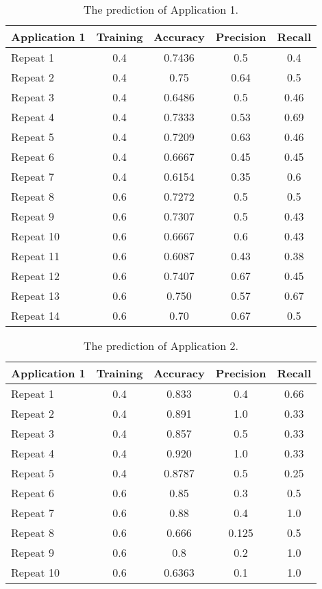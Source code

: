 \begin{table}[ht]
	\begin{center}
		\begin{tabular}{ | l | c | c | c | c | }
			\hline
			Application 1 & Training & Accuracy & Precision & Recall \\ \hline
			Repeat 1 & 0.4 & 0.7436 & 0.5  & 0.4  \\ \hline
			Repeat 2 & 0.4 & 0.75   & 0.64 & 0.5  \\ \hline
			Repeat 3 & 0.4 & 0.6486 & 0.5  & 0.46 \\ \hline
			Repeat 4 & 0.4 & 0.7333 & 0.53 & 0.69 \\ \hline
			Repeat 5 & 0.4 & 0.7209 & 0.63 & 0.46 \\ \hline
			Repeat 6 & 0.4 & 0.6667 & 0.45 & 0.45 \\ \hline
			Repeat 7 & 0.4 & 0.6154 & 0.35 & 0.6  \\ \hline
			Repeat 8 & 0.6 & 0.7272 & 0.5  & 0.5  \\ \hline
			Repeat 9 & 0.6 & 0.7307 & 0.5  & 0.43 \\ \hline
			Repeat 10& 0.6 & 0.6667 & 0.6  & 0.43 \\ \hline
			Repeat 11& 0.6 & 0.6087 & 0.43 & 0.38 \\ \hline
			Repeat 12& 0.6 & 0.7407 & 0.67 & 0.45 \\ \hline
			Repeat 13& 0.6 & 0.750  & 0.57 & 0.67 \\ \hline
			Repeat 14& 0.6 & 0.70   & 0.67 & 0.5  \\ \hline
		\end{tabular}
		\caption{ The prediction of Application 1. }
		\label{PredictResult}
	\end{center}
\end{table}

\begin{table}[ht]
	\begin{center}
		\begin{tabular}{ | l | c | c | c | c | }
			\hline
			Application 1 & Training & Accuracy & Precision & Recall \\ \hline
			Repeat 1 & 0.4 & 0.833  & 0.4  & 0.66  \\ \hline
			Repeat 2 & 0.4 & 0.891  & 1.0  & 0.33  \\ \hline
			Repeat 3 & 0.4 & 0.857  & 0.5  & 0.33  \\ \hline
			Repeat 4 & 0.4 & 0.920  & 1.0  & 0.33  \\ \hline
			Repeat 5 & 0.4 & 0.8787 & 0.5 & 0.25   \\ \hline
			Repeat 6 & 0.6 & 0.85   & 0.3  & 0.5   \\ \hline
			Repeat 7 & 0.6 & 0.88   & 0.4  & 1.0   \\ \hline
			Repeat 8 & 0.6 & 0.666  & 0.125& 0.5   \\ \hline
			Repeat 9 & 0.6 & 0.8    & 0.2  & 1.0   \\ \hline
			Repeat 10& 0.6 & 0.6363 & 0.1  & 1.0   \\ \hline
		\end{tabular}
		\caption{ The prediction of Application 2. }
		\label{PredictResult2}
	\end{center}
\end{table}